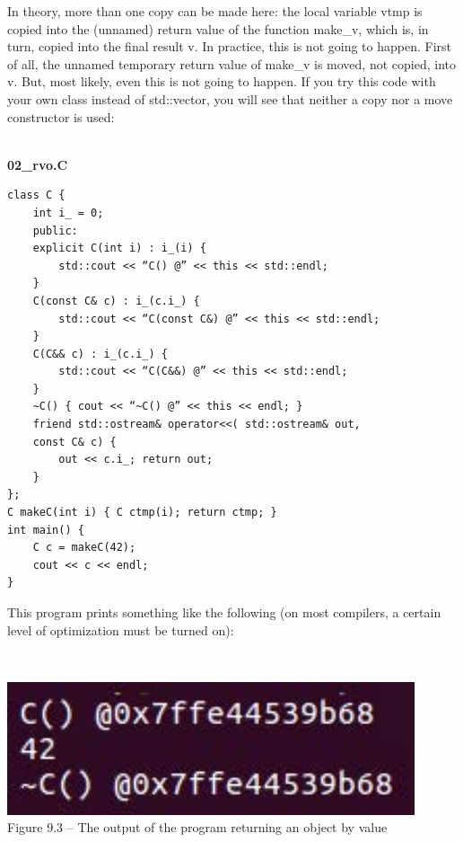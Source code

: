 In theory, more than one copy can be made here: the local variable vtmp is copied into the (unnamed) return value of the function make\_v, which is, in turn, copied into the final result v. In practice, this is not going to happen. First of all, the unnamed temporary return value of make\_v is moved, not copied, into v. But, most likely, even this is not going to happen. If you try this code with your own class instead of std::vector, you will see that neither a copy nor a move constructor is used:

\hspace*{\fill} \\ %
\noindent
\textbf{02\_rvo.C}
\begin{lstlisting}[style=styleCXX]
class C {
	int i_ = 0;
	public:
	explicit C(int i) : i_(i) { 
		std::cout << “C() @” << this << std::endl;
	}
	C(const C& c) : i_(c.i_) {
		std::cout << “C(const C&) @” << this << std::endl;
	}
	C(C&& c) : i_(c.i_) {
		std::cout << “C(C&&) @” << this << std::endl;
	}
	~C() { cout << “~C() @” << this << endl; }
	friend std::ostream& operator<<( std::ostream& out,
	const C& c) {
		out << c.i_; return out;
	}
};  
C makeC(int i) { C ctmp(i); return ctmp; }
int main() {
	C c = makeC(42);
	cout << c << endl;
}
\end{lstlisting}

This program prints something like the following (on most compilers, a certain level of optimization must be turned on):

\hspace*{\fill} \\ %
\begin{center}
\includegraphics[width=0.9\textwidth]{content/3/chapter9/images/3.jpg}\\
Figure 9.3 – The output of the program returning an object by value
\end{center}

